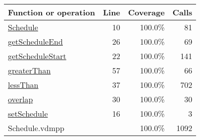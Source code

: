 \bigskip
\begin{longtable}{|l|r|r|r|}
\hline
Function or operation & Line & Coverage & Calls \\
\hline
\hline
\hyperref[Schedule:10]{Schedule} & 10&100.0\% & 81 \\
\hline
\hyperref[getScheduleEnd:26]{getScheduleEnd} & 26&100.0\% & 69 \\
\hline
\hyperref[getScheduleStart:22]{getScheduleStart} & 22&100.0\% & 141 \\
\hline
\hyperref[greaterThan:57]{greaterThan} & 57&100.0\% & 66 \\
\hline
\hyperref[lessThan:37]{lessThan} & 37&100.0\% & 702 \\
\hline
\hyperref[overlap:30]{overlap} & 30&100.0\% & 30 \\
\hline
\hyperref[setSchedule:16]{setSchedule} & 16&100.0\% & 3 \\
\hline
\hline
Schedule.vdmpp & & 100.0\% & 1092 \\
\hline
\end{longtable}

